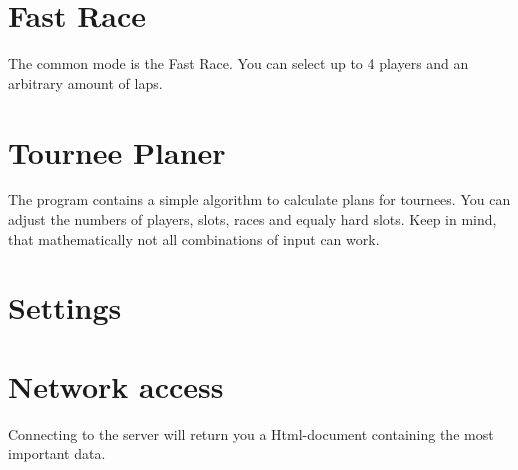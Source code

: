 \documentclass[11pt, a4paper, UKenglish, parskip=half+, oneside]{scrbook}
\begin{document}
\section{Fast Race}
The common mode is the Fast Race. You can select up to 4 players and an arbitrary amount of laps.
\section{Tournee Planer}
The program contains a simple algorithm to calculate plans for tournees. You can adjust the numbers of players, slots, races and equaly hard slots. Keep in mind, that mathematically not all combinations of input can work.
\section{Settings}
\section{Network access}
Connecting to the server will return you a Html-document containing the most important data.
\end{document}
